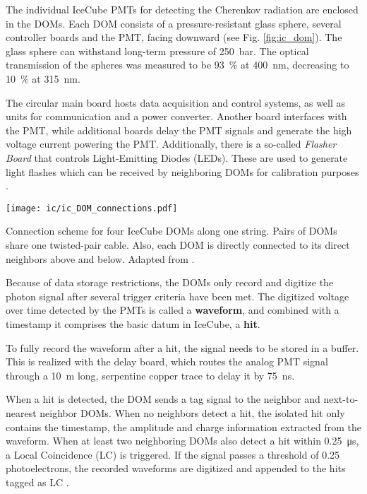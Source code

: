 The individual IceCube PMTs for detecting the Cherenkov radiation are enclosed in the DOMs. Each DOM consists of a pressure-resistant glass sphere, several controller boards and the PMT, facing downward (see Fig. \ref{fig:ic_dom}). The glass sphere can withstand long-term pressure of \SI{250}{\bar}. The optical transmission of the spheres was measured to be \SI{93}{\percent} at \SI{400}{\nm}, decreasing to \SI{10}{\percent} at \SI{315}{\nm}.

The circular main board hosts data acquisition and control systems, as well as units for communication and a power converter. Another board interfaces with the PMT, while additional boards delay the PMT signals and generate the high voltage current powering the PMT. Additionally, there is a so-called \textit{Flasher Board} that controls Light-Emitting Diodes (LEDs). These are used to generate light flashes which can be received by neighboring DOMs for calibration purposes .

\begin{marginfigure}
    \texttt{[image: ic/ic\_DOM\_connections.pdf]}
    \caption[IceCube DOM connections]{Connection scheme for four IceCube DOMs along one string. Pairs of DOMs share one twisted-pair cable. Also, each DOM is directly connected to its direct neighbors above and below. Adapted from \cite{Aartsen2017}.} 
\end{marginfigure}

Because of data storage restrictions, the DOMs only record and digitize the photon signal after several trigger criteria have been met. The digitized voltage over time detected by the PMTs is called a \textbf{waveform}, and combined with a timestamp it comprises the basic datum in IceCube, a \textbf{hit}.

To fully record the waveform after a hit, the signal needs to be stored in a buffer. This is realized with the delay board, which routes the analog PMT signal through a \SI{10}{\m} long, serpentine copper trace to delay it by \SI{75}{\ns}.

When a hit is detected, the DOM sends a tag signal to the neighbor and next-to-nearest neighbor DOMs. When no neighbors detect a hit, the isolated hit only contains the timestamp, the amplitude and charge information extracted from the waveform. When at least two neighboring DOMs also detect a hit within \SI{0.25}{\micro\s}, a Local Coincidence (LC) is triggered. If the signal passes a threshold of 0.25 photoelectrons, the recorded waveforms are digitized and appended to the hits tagged as LC \cite{Aartsen2017}.

